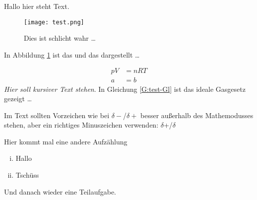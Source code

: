 \documentclass[./main.tex]{subfiles}
\begin{document}
\renewcommand{\tasktitle}{Allgemeine Chemie}
\renewcommand{\taskpoints}{3.5} %
\renewcommand{\taskweight}{8.7}
\aufgabenanfang

Hallo hier steht Text. \par

\blindtext
{}

\blindtext
{}
\blindtext

\begin{figure}[H]
\centering
\texttt{[image: test.png]}
\caption{Dies ist schlicht wahr \ldots }
\label{A:test-Abb}
\end{figure}

In Abbildung \ref{A:test-Abb} ist das und das dargestellt \ldots 

\begin{align}
    pV &= nRT \label{G:test-Gl}\\
    a &= b
\end{align}
\textit{Hier soll kursiver Text stehen}.
In Gleichung \ref{G:test-Gl} ist das ideale Gasgesetz gezeigt \ldots 

Im Text sollten Vorzeichen wie bei $\delta-$/$\delta+$ besser au\ss{}erhalb des Mathemodusses stehen, aber ein richtiges Minuszeichen verwenden: $\delta$+/$\delta$\textminus{}

Hier kommt mal eine andere Aufz\"ahlung
\begin{enumerate}[(i)]
    \item Hallo
    \item Tsch\"uss
\end{enumerate}
Und danach wieder eine Teilaufgabe.

\aufgabenende
\end{document}
